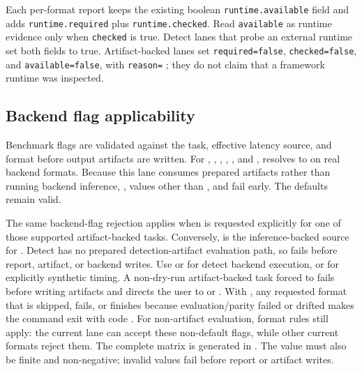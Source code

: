 Each per-format report keeps the existing boolean \texttt{runtime.available}
field and adds \texttt{runtime.required} plus \texttt{runtime.checked}. Read
\texttt{available} as runtime evidence only when \texttt{checked} is true.
Detect lanes that probe an external runtime set both fields to true.
Artifact-backed lanes set \texttt{required=false}, \texttt{checked=false}, and
\texttt{available=false}, with
\texttt{reason=} ; they do not claim that
a framework runtime was inspected.

\subsection{Backend flag applicability}
Benchmark flags are validated against the task, effective latency source, and
format before output artifacts are written. For ,
, , , , and
,  resolves to  on
real backend formats. Because this lane consumes prepared artifacts rather than
running backend inference, ,  values other than
, and  fail early. The defaults
 remain valid.

The same backend-flag rejection applies when  is requested
explicitly for one of those supported artifact-backed tasks. Conversely,
 is the inference-backed source for .
Detect has no prepared detection-artifact evaluation path, so
 fails before report,
artifact, or backend writes. Use  or
 for detect backend execution, or
 for explicitly synthetic timing. A non-dry-run
artifact-backed task forced to  fails before
writing artifacts and directs the user to  or .
With , any requested format that is skipped, fails, or finishes
 because evaluation/parity failed or drifted makes the command
exit with code .
For non-artifact evaluation, format rules still apply: the current
 lane can accept these non-default flags, while other current
formats reject them. The complete matrix is generated in
.
The  value must also be finite and non-negative; invalid values
fail before report or artifact writes.


